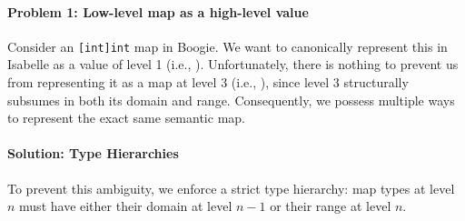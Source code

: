 \paragraph{Problem 1: Low-level map as a high-level value}
Consider an \lstinline[columns=fixed]{[int]int} map in Boogie.
We want to canonically represent this in Isabelle as a value of level 1 (i.e., ).
Unfortunately, there is nothing to prevent us from representing it as a map at level 3 (i.e., ), since level 3 structurally subsumes  in both its domain and range.
Consequently, we possess multiple ways to represent the exact same semantic map.

\paragraph{Solution: Type Hierarchies}
To prevent this ambiguity, we enforce a strict type hierarchy: map types at level $n$ must have either their domain at level $n-1$ or their range at level $n$.

